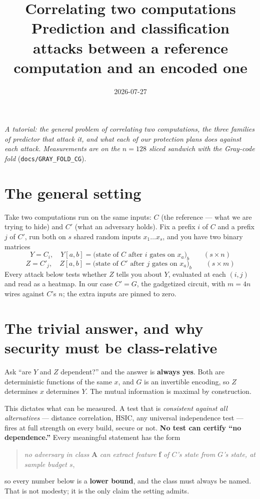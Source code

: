 \documentclass[11pt]{article}
\title{\textbf{Correlating two computations}\\[2pt]
\large Prediction and classification attacks between a reference computation
and an encoded one}
\author{}
\date{2026-07-27}
\newcommand{\code}[1]{\texttt{#1}}
\begin{document}
\maketitle

\noindent\emph{A tutorial: the general problem of correlating two computations,
the three families of predictor that attack it, and what each of our protection
plans does against each attack. Measurements are on the $n{=}128$ sliced
sandwich with the Gray-code fold} (\code{docs/GRAY\_FOLD\_CG}).

\section{The general setting}

Take two computations run on the same inputs: $C$ (the reference --- what we are
trying to hide) and $C'$ (what an adversary holds). Fix a prefix $i$ of $C$ and
a prefix $j$ of $C'$, run both on $s$ shared random inputs $x_1 \dots x_s$, and
you have two binary matrices
\[
  Y = C_i,\quad Y[a,b] = \bigl(\text{state of } C \text{ after } i \text{ gates on } x_a\bigr)_b
  \qquad (s \times n)
\]
\[
  Z = C'_j,\quad Z[a,b] = \bigl(\text{state of } C' \text{ after } j \text{ gates on } x_a\bigr)_b
  \qquad (s \times m)
\]
Every attack below tests whether $Z$ tells you about $Y$, evaluated at each
$(i,j)$ and read as a heatmap. In our case $C' = G$, the gadgetized circuit,
with $m = 4n$ wires against $C$'s $n$; the extra inputs are pinned to zero.

\section{The trivial answer, and why security must be class-relative}

Ask ``are $Y$ and $Z$ dependent?'' and the answer is \textbf{always yes}. Both
are deterministic functions of the same $x$, and $G$ is an invertible encoding,
so $Z$ determines $x$ determines $Y$. The mutual information is maximal by
construction.

This dictates what can be measured. A test that is \emph{consistent against all
alternatives} --- distance correlation, HSIC, any universal independence test
--- fires at full strength on every build, secure or not. \textbf{No test can
certify ``no dependence.''} Every meaningful statement has the form
\begin{quote}
\emph{no adversary in class} \textbf{A} \emph{can extract feature} \textbf{f}
\emph{of $C$'s state from $G$'s state, at sample budget $s$},
\end{quote}
so every number below is a \textbf{lower bound}, and the class must always be
named. That is not modesty; it is the only claim the setting admits.
\end{document}
